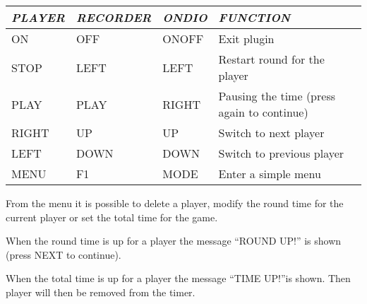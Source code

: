 \begin{center}\begin{tabular}{|p{1.917cm}|p{2.7649999cm}|p{1.7049999cm}|p{9.433001cm}|}
\hline
{\centering\bfseries\itshape
PLAYER 
\par}
&
{\centering\bfseries\itshape
RECORDER 
\par}
&
{\centering\bfseries\itshape
ONDIO 
\par}
&
{\centering\bfseries\itshape
FUNCTION 
\par}
\\\hline
{\centering
ON 
\par}
&
{\centering
OFF 
\par}
&
{\centering
ONOFF 
\par}
&
Exit plugin 
\\\hline
{\centering
STOP 
\par}
&
{\centering
LEFT 
\par}
&
{\centering
LEFT 
\par}
&
Restart round for the player 
\\\hline
{\centering
PLAY 
\par}
&
{\centering
PLAY 
\par}
&
{\centering
RIGHT 
\par}
&
Pausing the time (press again to continue) 
\\\hline
{\centering
RIGHT 
\par}
&
{\centering
UP 
\par}
&
{\centering
UP 
\par}
&
Switch to next player 
\\\hline
{\centering
LEFT 
\par}
&
{\centering
DOWN 
\par}
&
{\centering
DOWN 
\par}
&
Switch to previous player 
\\\hline
{\centering
MENU 
\par}
&
{\centering
F1 
\par}
&
{\centering
MODE 
\par}
&
Enter a simple menu 
\\\hline
\end{tabular}\end{center}
From the menu it is possible to delete a player, modify the round time
for the current player or set the total time for the game. 

When the round time is up for a player the message ``ROUND UP!'' is shown (press  NEXT to continue). 

When the total time is up for a player the message ``TIME UP!''is shown. Then player will  then be removed from the timer. 


